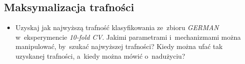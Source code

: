 \subsection{Maksymalizacja trafności}

\begin{itemize}
\item Uzyskaj jak najwyższą trafność klasyfikowania ze~zbioru \emph{GERMAN} w~eksperymencie \emph{10-fold CV}. Jakimi parametrami i~mechanizmami można manipulować, by~szukać najwyższej trafności? Kiedy można ufać tak uzyskanej trafności, a~kiedy można mówić o~nadużyciu?
\end{itemize}